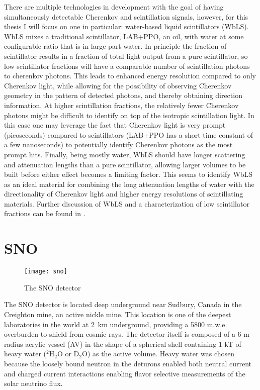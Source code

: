 There are multiple technologies in development with the goal of having simultaneously detectable Cherenkov and scintillation signals, however, for this thesis I will focus on one in particular: water-based liquid scintillators (WbLS).
WbLS mixes a traditional scintillator, LAB+PPO, an oil, with water at some configurable ratio that is in large part water.
In principle the fraction of scintillator results in a fraction of total light output from a pure scintillator, so low scintillator fractions will have a comparable number of scintillation photons to cherenkov photons. 
This leads to enhanced energy resolution compared to only Cherenkov light, while allowing for the possibility of observing Cherenkov geometry in the pattern of detected photons, and thereby obtaining direction information.
At higher scintillation fractions, the relatively fewer Cherenkov photons might be difficult to identify on top of the isotropic scintillation light.
In this case one may leverage the fact that Cherenkov light is very prompt (picoseconds) compared to scintillators (LAB+PPO has a short time constant of a few nanoseconds) to potentially identify Cherenkov photons as the most prompt hits.
Finally, being mostly water, WbLS should have longer scattering and attenuation lengths than a pure scintillator, allowing larger volumes to be built before either effect becomes a limiting factor.
This seems to identify WbLS as an ideal material for combining the long attenuation lengths of water with the directionality of Cherenkov light and higher energy resolutions of scintillating materials.
Further discussion of WbLS and a characterization of low scintillator fractions can be found in .

\section{SNO}

\begin{figure}
\centering
    \texttt{[image: sno]}
    \caption{\label{fig:sno}The SNO detector \cite{3phase}}
\end{figure}

The SNO \cite{sno} detector is located deep underground near Sudbury, Canada in the Creighton mine, an active nickle mine.
This location is one of the deepest laboratories in the world at $2$~km underground, providing a 5800 m.w.e. overburden to shield from cosmic rays.
The detector itself is composed of a 6-m radius acrylic vessel (AV) in the shape of a spherical shell containing 1 kT of heavy water ($^2$H$_2$O or D$_2$O) as the active volume.
Heavy water was chosen because the loosely bound neutron in the deturons enabled both neutral current and charged current interactions enabling flavor selective measurements of the solar neutrino flux.

